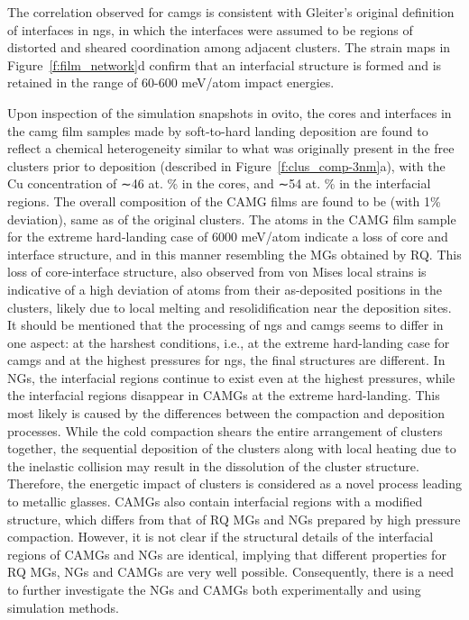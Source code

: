 \begin{changebar}
The correlation observed for \gls{camg}s is consistent with Gleiter’s original definition of interfaces \cite{Gleiter1991} in \gls{ng}s, in which the interfaces were assumed to be regions of distorted and sheared coordination among adjacent clusters. The strain maps in Figure~\ref{f:film_network}d confirm that an interfacial structure is formed and is retained in the range of 60-600 meV/atom impact energies.\par

Upon inspection of the simulation snapshots in \gls{ovito}, the cores and interfaces in the \gls{camg} film samples made by soft-to-hard landing deposition are found to reflect a chemical heterogeneity similar to what was originally present in the free clusters prior to deposition (described in Figure~\ref{f:clus_comp-3nm}a), with the Cu concentration of ∼46 at. \% in the cores, and ∼54 at. \% in the interfacial regions. The overall composition of the CAMG films are found to be \cz (with 1\% deviation), same as of the original clusters. The atoms in the CAMG film sample for the extreme hard-landing case of 6000 meV/atom indicate a loss of core and interface structure, and in this manner resembling the MGs obtained by RQ. This loss of core-interface structure, also observed from von Mises local strains is indicative of a high deviation of atoms from their as-deposited positions in the clusters, likely due to local melting and resolidification near the deposition sites. It should be mentioned that the processing of \gls{ng}s and \gls{camg}s seems to differ in one aspect: at the harshest conditions, i.e., at the extreme hard-landing case for \gls{camg}s and at the highest pressures for \gls{ng}s, the final structures are different. In NGs, the interfacial regions continue to exist even at the highest pressures, while the interfacial regions disappear in CAMGs at the extreme hard-landing. This most likely is caused by the differences between the
compaction and deposition processes. While the cold compaction shears the entire arrangement of clusters together, the sequential deposition of the clusters along with local heating due to the inelastic collision may result in the dissolution of the cluster structure. Therefore, the energetic impact of clusters is considered as a novel process leading to metallic glasses. CAMGs also contain interfacial regions with a modified structure, which differs from that of RQ MGs and NGs prepared by high pressure compaction. However, it is not clear if the structural details of the interfacial regions of CAMGs and NGs are identical, implying that different properties for RQ MGs, NGs and CAMGs are very well possible. Consequently, there is a need to further investigate the NGs and CAMGs both experimentally and using simulation methods. \par


\end{changebar}
